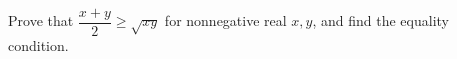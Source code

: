Prove that $\dfrac{x+y}{2}\ge\sqrt{xy}$ for nonnegative real $x,y$, and find the equality condition.
